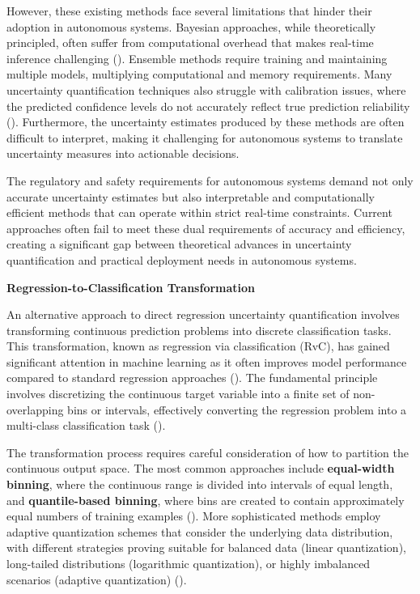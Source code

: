 However, these existing methods face several limitations that hinder their adoption in autonomous systems. Bayesian approaches, while theoretically principled, often suffer from computational overhead that makes real-time inference challenging (\cite{anand2025uncertainty}). Ensemble methods require training and maintaining multiple models, multiplying computational and memory requirements. Many uncertainty quantification techniques also struggle with calibration issues, where the predicted confidence levels do not accurately reflect true prediction reliability (\cite{gawlikowski2021survey}). Furthermore, the uncertainty estimates produced by these methods are often difficult to interpret, making it challenging for autonomous systems to translate uncertainty measures into actionable decisions.

The regulatory and safety requirements for autonomous systems demand not only accurate uncertainty estimates but also interpretable and computationally efficient methods that can operate within strict real-time constraints. Current approaches often fail to meet these dual requirements of accuracy and efficiency, creating a significant gap between theoretical advances in uncertainty quantification and practical deployment needs in autonomous systems.

\textbf{Regression-to-Classification Transformation}

An alternative approach to direct regression uncertainty quantification involves transforming continuous prediction problems into discrete classification tasks. This transformation, known as regression via classification (RvC), has gained significant attention in machine learning as it often improves model performance compared to standard regression approaches (\cite{stewart2022regression, berg2020deep}). The fundamental principle involves discretizing the continuous target variable into a finite set of non-overlapping bins or intervals, effectively converting the regression problem into a multi-class classification task (\cite{torgo1996regression, torgo1997regression}).

The transformation process requires careful consideration of how to partition the continuous output space. The most common approaches include \textbf{equal-width binning}, where the continuous range is divided into intervals of equal length, and \textbf{quantile-based binning}, where bins are created to contain approximately equal numbers of training examples (\cite{berg2020deep, barkov2024efficient}). More sophisticated methods employ adaptive quantization schemes that consider the underlying data distribution, with different strategies proving suitable for balanced data (linear quantization), long-tailed distributions (logarithmic quantization), or highly imbalanced scenarios (adaptive quantization) (\cite{xiong2023deep}).

